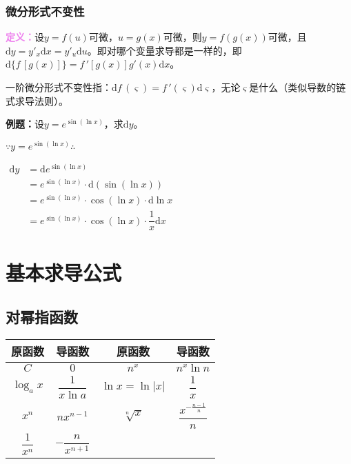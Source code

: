 \documentclass[UTF8, 12pt]{ctexart}
\begin{document}
\subsubsection{微分形式不变性}

\textcolor{violet}{\textbf{定义：}}设$y=f(u)$可微，$u=g(x)$可微，则$y=f(g(x))$可微，且$\textrm{d}y=y'_{x}\textrm{d}x=y'_{u}\textrm{d}u$。即对哪个变量求导都是一样的，即$\textrm{d}\{f\,[g(x)]\}=f\,'[g(x)]g'(x)\textrm{d}x$。

一阶微分形式不变性指：$\textrm{d}f\,(\varsigma)=f\,'(\varsigma)\textrm{d}\varsigma$，无论$\varsigma$是什么（类似导数的链式求导法则）。

\textbf{例题：}设$y=e^{\sin(\ln x)}$，求$\textrm{d}y$。

$\because y=e^{\sin(\ln x)} \therefore$

$
\begin{aligned}
    \textrm{d}y &=\textrm{d}e^{\sin(\ln x)} \\
    & =e^{\sin(\ln x)}\cdot\textrm{d}(\sin(\ln x)) \\
    & =e^{\sin(\ln x)}\cdot\cos(\ln x)\cdot\textrm{d}\ln x \\
    & =e^{\sin(\ln x)}\cdot\cos(\ln x)\cdot\dfrac{1}{x}\textrm{d}x
\end{aligned}
$

\section{基本求导公式}

\subsection{对幂指函数}

\begin{center}
    \begin{tabular}{|c|c|c|c|}
        \hline
        原函数 & 导函数 & 原函数 & 导函数\\ \hline
        $C$ & $0$ & $n^x$ & $n^x\ln n$ \\ \hline
        $\log_ax$ & $\dfrac{1}{x\ln a}$ & $\ln x=\ln\vert x\vert$ & $\dfrac{1}{x}$ \\ \hline
        $x^n$ & $nx^{n-1}$ & $\sqrt[n]{x}$ & $\dfrac{x^{-\frac{n-1}{n}}}{n}$ \\ \hline
        $\dfrac{1}{x^n}$ & $-\dfrac{n}{x^{n+1}}$ & & \\ 
        \hline
    \end{tabular}
\end{center}
\end{document}

